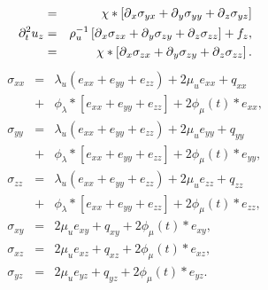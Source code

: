 \documentclass[11pt]{article}
\begin{document}
{\begin{eqnarray}
            & = & \chi*\left[\mbox{$\partial$}_x \sigma_{yx} +\mbox{$\partial$}_y \sigma_{yy} 
                                 +\mbox{$\partial$}_z \sigma_{yz}\right] \nonumber         \\
  \partial^2_t{u}_z & = & \rho^{-1}_u\left[\mbox{$\partial$}_x \sigma_{zx} +\mbox{$\partial$}_y \sigma_{zy} 
                                 +\mbox{$\partial$}_z \sigma_{zz}\right] + f_z, \nonumber  \\
            & = & \chi*\left[\mbox{$\partial$}_x \sigma_{zx} +\mbox{$\partial$}_y \sigma_{zy} 
                                 +\mbox{$\partial$}_z \sigma_{zz}\right].         \nonumber\\
\end{eqnarray}
%
\begin{eqnarray}
  \sigma_{xx} & = & \lambda_u \left (e_{xx} + e_{yy} + e_{zz}\right)
                                   + 2\mu_u e_{xx} +q_{xx}         \nonumber\\  
              & + & \phi_{\lambda}*[e_{xx}+e_{yy}+e_{zz}] 
                                    + 2\phi_{\mu}(t)*e_{xx},       \nonumber\\
  \sigma_{yy} & = & \lambda_u \left (e_{xx} + e_{yy} + e_{zz}\right)
                                    + 2\mu_u e_{yy} +q_{yy}        \nonumber\\ 
              & + & \phi_{\lambda}*[e_{xx}+e_{yy}+e_{zz}] 
                                    + 2\phi_{\mu}(t)*e_{yy},       \nonumber\\
  \sigma_{zz} & = & \lambda_u \left (e_{xx} + e_{yy} + e_{zz}\right)
                                    + 2\mu_u e_{zz} +q_{zz}        \nonumber\\ 
              & + & \phi_{\lambda}*[e_{xx}+e_{yy}+e_{zz}] 
                                    + 2\phi_{\mu}(t)*e_{zz},       \nonumber\\
  \sigma_{xy} & = & 2\mu_u e_{xy} +q_{xy} + 2\phi_{\mu}(t)*e_{xy}, \nonumber\\
  \sigma_{xz} & = & 2\mu_u e_{xz} +q_{xz} + 2\phi_{\mu}(t)*e_{xz}, \nonumber\\
  \sigma_{yz} & = & 2\mu_u e_{yz} +q_{yz}+  2\phi_{\mu}(t)*e_{yz}. \nonumber\\
\end{eqnarray}
%
}
\end{document}
